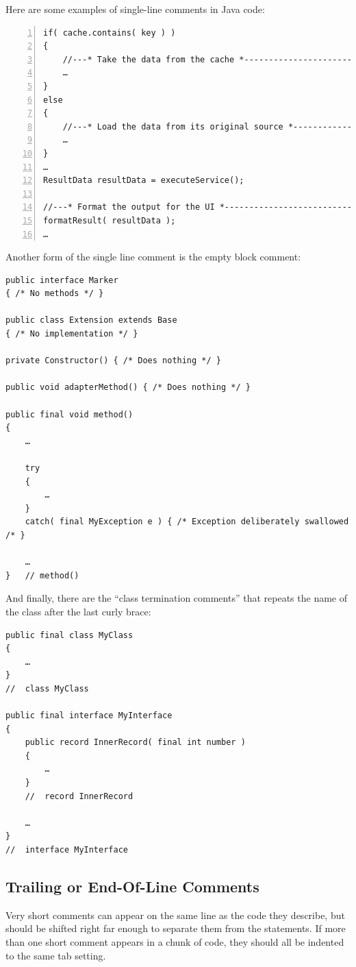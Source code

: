 \documentclass[11pt,a4paper, titlepage, parskip=half, headsepline, footsepline, cleardoublepage=current, headheight=1cm]{scrbook}
\begin{document}
Here are some examples of single-line comments in Java code:
\begin{lstlisting}[numbers=left]
if( cache.contains( key ) )
{
    //---* Take the data from the cache *----------------------------
    …
}
else
{
    //---* Load the data from its original source *------------------
    …
}
…
ResultData resultData = executeService();

//---* Format the output for the UI *--------------------------------
formatResult( resultData );
…
\end{lstlisting}

Another form of the single line comment is the empty block comment:
\begin{lstlisting}
public interface Marker
{ /* No methods */ }

public class Extension extends Base
{ /* No implementation */ }

private Constructor() { /* Does nothing */ }

public void adapterMethod() { /* Does nothing */ }

public final void method()
{
    …

    try
    {
        …
    }
    catch( final MyException e ) { /* Exception deliberately swallowed /* }

    …
}   // method()
\end{lstlisting}

And finally, there are the “class termination comments” that repeats the name of the class after the last curly brace:
\begin{lstlisting}
public final class MyClass
{
    …
}
//  class MyClass

public final interface MyInterface
{
    public record InnerRecord( final int number )
    {
        …
    }
    //  record InnerRecord
    
    …
}
//  interface MyInterface

\end{lstlisting}

\subsection{Trailing or End-Of-Line Comments}\label{sec:TrailingOrEndOfLineComments}
Very short comments can appear on the same line as the code they describe, but should be shifted right far enough to separate them from the statements. If more than one short comment appears in a chunk of code, they should all be indented to the same tab setting.
\end{document}
